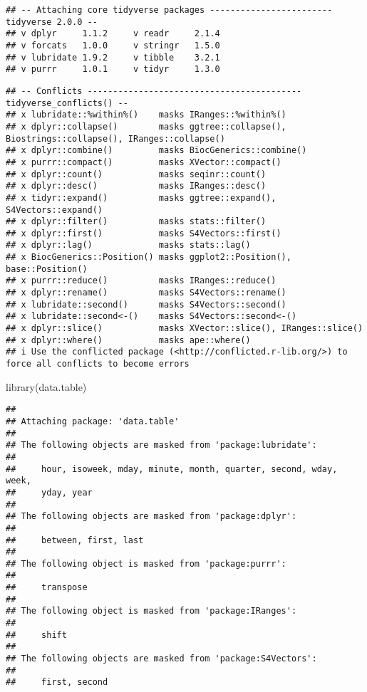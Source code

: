 \documentclass[
]{article}
\newenvironment{Shaded}{\begin{snugshade}}{\end{snugshade}}
\newcommand{\FunctionTok}[1]{\textcolor[rgb]{0.00,0.00,0.00}{#1}}
\newcommand{\NormalTok}[1]{#1}
\begin{document}
\begin{verbatim}
## -- Attaching core tidyverse packages ------------------------ tidyverse 2.0.0 --
## v dplyr     1.1.2     v readr     2.1.4
## v forcats   1.0.0     v stringr   1.5.0
## v lubridate 1.9.2     v tibble    3.2.1
## v purrr     1.0.1     v tidyr     1.3.0
\end{verbatim}

\begin{verbatim}
## -- Conflicts ------------------------------------------ tidyverse_conflicts() --
## x lubridate::%within%()    masks IRanges::%within%()
## x dplyr::collapse()        masks ggtree::collapse(), Biostrings::collapse(), IRanges::collapse()
## x dplyr::combine()         masks BiocGenerics::combine()
## x purrr::compact()         masks XVector::compact()
## x dplyr::count()           masks seqinr::count()
## x dplyr::desc()            masks IRanges::desc()
## x tidyr::expand()          masks ggtree::expand(), S4Vectors::expand()
## x dplyr::filter()          masks stats::filter()
## x dplyr::first()           masks S4Vectors::first()
## x dplyr::lag()             masks stats::lag()
## x BiocGenerics::Position() masks ggplot2::Position(), base::Position()
## x purrr::reduce()          masks IRanges::reduce()
## x dplyr::rename()          masks S4Vectors::rename()
## x lubridate::second()      masks S4Vectors::second()
## x lubridate::second<-()    masks S4Vectors::second<-()
## x dplyr::slice()           masks XVector::slice(), IRanges::slice()
## x dplyr::where()           masks ape::where()
## i Use the conflicted package (<http://conflicted.r-lib.org/>) to force all conflicts to become errors
\end{verbatim}

\begin{Shaded}
\begin{Highlighting}[]
\FunctionTok{library}\NormalTok{(data.table)}
\end{Highlighting}
\end{Shaded}

\begin{verbatim}
## 
## Attaching package: 'data.table'
## 
## The following objects are masked from 'package:lubridate':
## 
##     hour, isoweek, mday, minute, month, quarter, second, wday, week,
##     yday, year
## 
## The following objects are masked from 'package:dplyr':
## 
##     between, first, last
## 
## The following object is masked from 'package:purrr':
## 
##     transpose
## 
## The following object is masked from 'package:IRanges':
## 
##     shift
## 
## The following objects are masked from 'package:S4Vectors':
## 
##     first, second
\end{verbatim}
\end{document}
